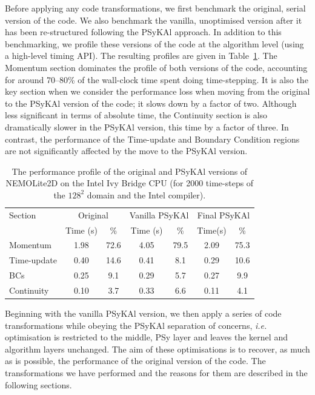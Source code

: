 \documentclass[gmdd, manuscript]{copernicus}
\begin{document}
Before applying any code transformations, we first benchmark the
original, serial version of the code. We also benchmark the vanilla,
unoptimised version after it has been re-structured following the
{PS}y{KA}l approach. In addition to this benchmarking, we profile these
versions of the code at the algorithm level (using a high-level timing
API). The resulting profiles are given in
Table~\ref{TABLE_profile}. The Momentum section dominates the profile
of both versions of the code, accounting for around 70--80\% of the
wall-clock time spent doing time-stepping. It is also the key section
when we consider the performance loss when moving from the original to
the {PS}y{KA}l version of the code; it slows down by a factor of
two. Although less significant in terms of absolute time, the
Continuity section is also dramatically slower in the {PS}y{KA}l version,
this time by a factor of three. In contrast, the performance of the
Time-update and Boundary Condition regions are not significantly
affected by the move to the {PS}y{KA}l version.

\begin{table}[!t]
\caption{The performance profile of the original and {PS}y{KA}l versions
  of NEMOLite2D on the Intel Ivy Bridge CPU (for 2000 time-steps of the
  $128^{2}$ domain and the Intel compiler).}
\label{TABLE_profile}
\centering
\begin{tabular}{l|c|c|c|c|c|c}
\hline
Section & \multicolumn{2}{c|}{Original} & \multicolumn{2}{c|}{Vanilla {PS}y{KA}l} &
\multicolumn{2}{c}{Final {PS}y{KA}l} \\
        & Time (s) & \%  & Time (s) & \%  & Time(s) & \% \\
\hline
Momentum    & 1.98  & 72.6  & 4.05  & 79.5 & 2.09 & 75.3 \\
Time-update & 0.40  & 14.6  & 0.41  & 8.1  & 0.29 & 10.6 \\
BCs         & 0.25  & 9.1   & 0.29  & 5.7  & 0.27 & 9.9  \\
Continuity  & 0.10  & 3.7   & 0.33  & 6.6  & 0.11 & 4.1  \\
\hline
\end{tabular}
\end{table}

Beginning with the vanilla {PS}y{KA}l version, we then apply a series of
code transformations while obeying the {PS}y{KA}l separation of concerns,
\textit{i.e.} optimisation is restricted to the middle, {PS}y layer and
leaves the kernel and algorithm layers unchanged. The aim of these
optimisations is to recover, as much as is possible, the performance
of the original version of the code. The transformations we have
performed and the reasons for them are described in the following sections.
\end{document}
